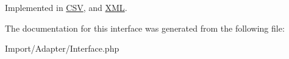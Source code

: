 Implemented in \hyperlink{class_anemo_1_1_import_1_1_adapter_1_1_c_s_v_a75416ddc6d147a0aaca83783f838403a}{CSV}, and \hyperlink{class_anemo_1_1_import_1_1_adapter_1_1_x_m_l_a75416ddc6d147a0aaca83783f838403a}{XML}.



The documentation for this interface was generated from the following file:\begin{DoxyCompactItemize}
\item 
Import/Adapter/Interface.php\end{DoxyCompactItemize}
